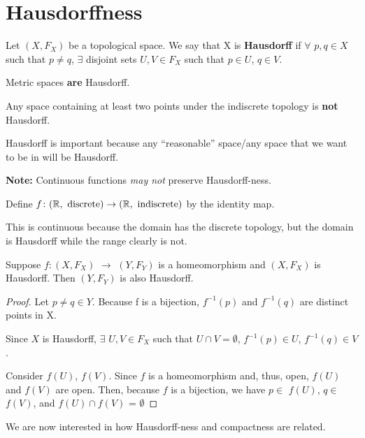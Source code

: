 

\section{Hausdorffness} 
\begin{definition}
	Let $(X, F _X)$ be a topological space. We say that X is \textbf{Hausdorff} if $\forall$ $p, q \in X$ such that $p \neq q$, $\exists$ disjoint sets $U, V \in F_X$ such that $p \in U$, $q \in V$. 
\end{definition}
\begin{example}
	Metric spaces \textbf{are} Hausdorff. 
\end{example}
\begin{example}
	 Any space containing at least two points under the indiscrete topology is \textbf{not} Hausdorff. 
\end{example}

Hausdorff is important because any ``reasonable'' space/any space that we want to be in will be Hausdorff.

\textbf{Note:} Continuous functions \emph{may not} preserve Hausdorff-ness. 
\begin{example}
	Define $f\colon(\mathbb R,\text{ discrete})\to (\mathbb R,\text{ indiscrete})$ by the identity map. 
\end{example}

This is continuous because the domain has the discrete topology, but the domain is Hausdorff while the range clearly is not. 
\begin{smallfact}
	Suppose $f \colon (X, F_X)$ $\to$ $(Y, F_Y)$ is a homeomorphism and $(X, F_X)$ is Hausdorff. Then $(Y, F_Y)$ is also Hausdorff. 
\end{smallfact}
\begin{proof}
	Let $p \neq q \in Y$. Because f is a bijection, $f^{-1}(p)$ and $f^{-1}(q)$ are distinct points in X.
	
	Since $X$ is Hausdorff, $\exists$ $U, V \in F_X$ such that $U \cap V = \emptyset$, $f^{-1}(p) \in U$, $f^{-1}(q) \in V$.
	
	Consider $f(U)$, $f(V)$. Since $f$ is a homeomorphism and, thus, open, $f(U)$ and $f(V)$ are open. Then, because $f$ is a bijection, we have $p \in$ $f(U)$, $q \in$ $f(V)$, and $f(U) \cap f(V)$ = $\emptyset$ 
\end{proof}

We are now interested in how Hausdorff-ness and compactness are related.\\

